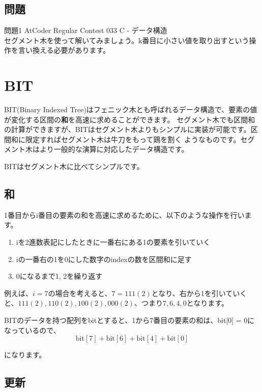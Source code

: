 \subsection{問題}
\noindent 問題1 AtCoder Regular Contest 033 C - データ構造 \\
セグメント木を使って解いてみましょう。k番目に小さい値を取り出すという操作を言い換える必要があります。

\newpage

\section{BIT}
BIT(Binary Indexed Tree)はフェニック木とも呼ばれるデータ構造で、要素の値が変化する区間の\textbf{和}を高速に求めることができます。
セグメント木でも区間和の計算ができますが、BITはセグメント木よりもシンプルに実装が可能です。区間和に限定すればセグメント木は牛刀をもって鶏を割く
ようなものです。セグメント木はより一般的な演算に対応したデータ構造です。

BITはセグメント木に比べてシンプルです。

\subsection{和}

1番目からi番目の要素の和を高速に求めるために、以下のような操作を行います。

\begin{enumerate}
	\item iを2進数表記にしたときに一番右にある1の要素を引いていく
	\item iの一番右の1を0にした数字のindexの数を区間和に足す
	\item 0になるまで1, 2を繰り返す
\end{enumerate}

例えば、$i = 7$の場合を考えると、$7 = 111(2)$となり、右から1を引いていくと、$111(2), 110(2), 100(2), 000(2)$、つまり$7, 6, 4, 0$となります。

BITのデータを持つ配列をbitとすると、1から7番目の要素の和は、bit[0] = 0になっているので、
\begin{equation*}
	\text{bit}[7] + \text{bit}[6] + \text{bit}[4] + \text{bit}[0]
\end{equation*}

になります。

\subsection{更新}

